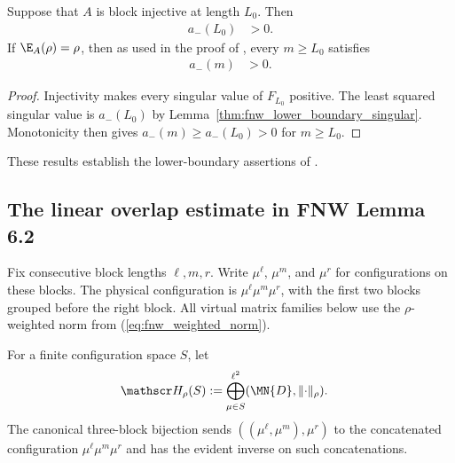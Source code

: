 \begin{lemma}
    \label{thm:fnw_lower_boundary_block_injective_pos}
    \leanok
    Suppose that $A$ is block injective at length $L_0$. Then
    \begin{align}
        a_-(L_0) & >0.
        \label{eq:fnw_lower_boundary_block_injective_pos}
    \end{align}
    If $\E_A(\rho)=\rho$, then as used in the proof of
    \cite[Lemma~6.2]{Fannes1992Finitely}, every $m\geq L_0$ satisfies
    \begin{align}
        a_-(m) & >0.
        \label{eq:fnw_lower_boundary_block_injective_pos_mono}
    \end{align}
\end{lemma}

\begin{proof}
    \leanok
    Injectivity makes every singular value of $F_{L_0}$ positive. The least
    squared singular value is $a_-(L_0)$ by
    Lemma~\ref{thm:fnw_lower_boundary_singular}. Monotonicity then gives
    $a_-(m)\geq a_-(L_0)>0$ for $m\geq L_0$.
\end{proof}

These results establish the lower-boundary assertions of
\cite[Lemma~5.3]{Fannes1992Finitely}.

\subsection{The linear overlap estimate in FNW Lemma 6.2}
\label{subsec:fnw_linear_overlap_estimate}

Fix consecutive block lengths $\ell,m,r$. Write $\mu^\ell$, $\mu^m$, and
$\mu^r$ for configurations on these blocks. The physical configuration is
$\mu^\ell\mu^m\mu^r$, with the first two blocks grouped before the right
block. All virtual matrix families below use the $\rho$-weighted norm from
(\ref{eq:fnw_weighted_norm}).

\begin{definition}
    \label{def:fnw_weighted_spectator_families}
    \leanok
    For a finite configuration space $S$, let
    \begin{align}
        \mathscr H_\rho(S)
         & :=\bigoplus_{\mu\in S}^{\ell^2}(\MN{D},\lVert\cdot\rVert_\rho).
        \label{eq:fnw_weighted_spectator_space}
    \end{align}
    The canonical three-block bijection sends
    $((\mu^\ell,\mu^m),\mu^r)$ to the concatenated configuration
    $\mu^\ell\mu^m\mu^r$ and has the evident inverse on such concatenations.
\end{definition}

